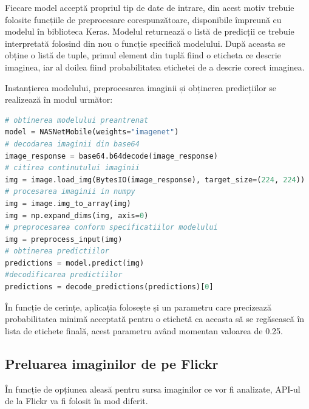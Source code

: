 Fiecare model acceptă propriul tip de date de intrare, din acest motiv trebuie folosite funcțiile de preprocesare corespunzătoare, disponibile împreună cu modelul în biblioteca Keras. Modelul returnează o listă de predicții ce trebuie interpretată folosind din nou o funcție specifică modelului. După aceasta se obține  o listă de tuple, primul element din tuplă fiind o eticheta ce  descrie imaginea, iar al doilea fiind probabilitatea etichetei de a descrie corect imaginea.

Instanțierea modelului, preprocesarea imaginii și obținerea predicțiilor se realizează în modul următor:

 
 
 
\lstset{style=mystyle}

\begin{lstlisting}[language=Python]
# obtinerea modelului preantrenat
model = NASNetMobile(weights="imagenet")
# decodarea imaginii din base64
image_response = base64.b64decode(image_response)
# citirea continutului imaginii
img = image.load_img(BytesIO(image_response), target_size=(224, 224))
# procesarea imaginii in numpy
img = image.img_to_array(img)
img = np.expand_dims(img, axis=0)
# preprocesarea conform specificatiilor modelului
img = preprocess_input(img)
# obtinerea predictiilor
predictions = model.predict(img)
#decodificarea predictiilor
predictions = decode_predictions(predictions)[0]
\end{lstlisting}

În funcție de cerințe, aplicația folosește și un parametru care precizează probabilitatea minimă acceptată pentru o etichetă ca aceasta să se regăsească în lista de etichete finală, acest parametru având momentan valoarea de 0.25.

\subsection{Preluarea imaginilor de pe Flickr}
În funcție de opțiunea aleasă pentru sursa imaginilor ce vor fi analizate, API-ul de la Flickr va fi folosit în mod diferit.

